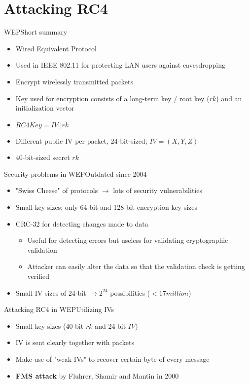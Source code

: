 \documentclass[
	aspectratio=169,	%
	onlytextwidth,		%
	t,					%
	]{beamer}
\begin{document}
\section{Attacking RC4}

\begin{frame}[fragile]{WEP}{Short summary}
	\begin{itemize}
		\item Wired Equivalent Protocol
		\item Used in IEEE 802.11 for protecting LAN users against eavesdropping
		\item Encrypt wirelessly transmitted packets
		\item Key used for encryption consists of a long-term key / root key ($rk$) and an initialization vector
		\item $RC4Key = IV||rk$
		\item Different public IV per packet, 24-bit-sized; $IV=(X,Y,Z)$
		\item 40-bit-sized secret $rk$
	\end{itemize}
\end{frame}

\begin{frame}[fragile]{Security problems in WEP}{Outdated since 2004}
	\begin{itemize}
		\item "Swiss Cheese" of protocols $\rightarrow$ lots of security vulnerabilities
		\item Small key sizes; only 64-bit and 128-bit encryption key sizes
		\item CRC-32 for detecting changes made to data
		\begin{itemize}
			\item Useful for detecting errors but useless for validating cryptographic validation
			\item Attacker can easily alter the data so that the validation check is getting verified
		\end{itemize}
		\item Small IV sizes of 24-bit $\rightarrow 2^{24}$ possibilities ($<17 million$)
	\end{itemize}
\end{frame}

\begin{frame}[fragile]{Attacking RC4 in WEP}{Utilizing IVs}
	\begin{itemize}
		\item Small key sizes (40-bit $rk$ and 24-bit $IV$)
		\item IV is sent clearly together with packets
		\item Make use of "weak IVs" to recover certain byte of every message
		\item \textbf{FMS attack} by Fluhrer, Shamir and Mantin in 2000
	\end{itemize}
\end{frame}
\end{document}
